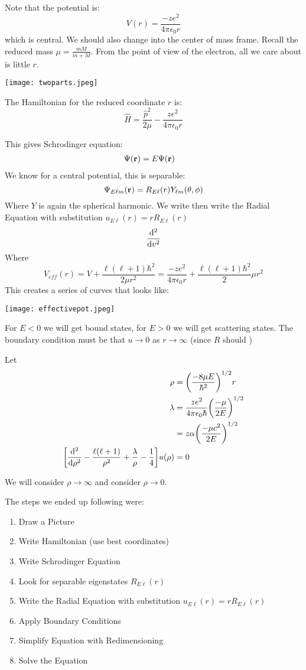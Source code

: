 Note that the potential is:
\[ V(r) = \frac{-ze^2}{4 \pi \epsilon_0 r} \]
which is central. We should also change into the center of mass frame.
Recall the reduced mass $\mu = \frac{mM}{m + M}$. From the point of view of the electron, all we care about is little $r$.

\texttt{[image: twoparts.jpeg]}

The Hamiltonian for the reduced coordinate $r$ is:
\[ \hat{H} = \frac{\hat{p}^2}{2\mu} - \frac{ze^2}{4\pi\epsilon_0 r} \]

This gives Schrodinger equation:
\begin{align*}
    [-\frac{\hbar^2}{2\mu}\nabla^2 - \frac{ze^2}{4\pi\epsilon_0 r}] \Psi(\mbf{r}) &= E \Psi(\mbf{r})
\end{align*}
We know for a central potential, this is separable:
\[ \Psi_{E\ell m}(\mathbf{r}) = R_{E \ell}(r) Y_{\ell m}(\theta, \phi) \]
Where $Y$ is again the spherical harmonic. We write then write the Radial Equation with substitution $u_{E\ell}(r) = r R_{E\ell}(r)$
\begin{align*}
    \dv{^2}{v^2}
\end{align*}
Where 
\[ V_{eff}(r) = V + \frac{\ell(\ell + 1)\hbar^2}{2\mu r^2} = \frac{-ze^2}{4\pi\epsilon_0 r} + \frac{\ell(\ell + 1)\hbar^2} 2\mu r^2\]
This creates a series of curves that looks like:

\texttt{[image: effectivepot.jpeg]}

For $E < 0$ we will get bound states, for $E > 0$ we will get scattering states.
The boundary condition must be that $u \to 0$ as $r \to \infty$ (since $R$ should )

Let
\begin{align*}
    \rho &= \qty(\frac{-8\mu E}{\hbar^2})^{1/2} r \\
    \lambda &= \frac{ze^2}{4\pi\epsilon_0 \hbar} \qty(\frac{-\mu}{2E})^{1/2} \\
    &= z \alpha \qty(\frac{-\mu c^2}{2E})^{1/2} \\
    \qty[\dv{^2}{\rho^2} - \frac{\ell(\ell + 1)}{\rho^2} + \frac{\lambda}{\rho} - \frac{1}{4}] u(\rho) &= 0
\end{align*}

We will consider $\rho \to \infty$ and consider $\rho \to 0$.

The steps we ended up following were:
\begin{enumerate}
    \item Draw a Picture
    \item Write Hamiltonian (use best coordinates)
    \item Write Schrodinger Equation
    \item Look for separable eigenstates $R_{E\ell}(r)$
    \item Write the Radial Equation with substitution $u_{E\ell}(r) = r R_{E\ell}(r)$
    \item Apply Boundary Conditions
    \item Simplify Equation with Redimensioning
    \item Solve the Equation
\end{enumerate}
